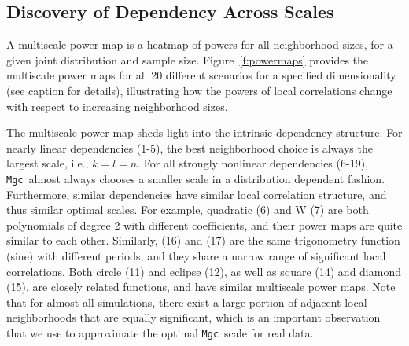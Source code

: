 \documentclass[11pt]{article}
\providecommand{\sct}[1]{{\sc \texttt{#1}}}
\newcommand{\Mgc}{\sct{Mgc}}
\newcommand{\Mgcp}{\sct{Mgc$_P$}}
\newcommand{\Hhg}{\sct{Hhg}}
\newcommand{\Dcorr}{\sct{Dcorr}}
\newcommand{\Mcorr}{\sct{Mcorr}}
\newcommand{\Mantel}{\sct{Mantel}}
\begin{document}

\subsection*{Discovery of Dependency Across Scales}
\label{main3}

A multiscale power map is a heatmap of powers for all neighborhood sizes, for a given joint distribution and sample size.
Figure~\ref{f:powermaps} provides the multiscale power maps for all 20 different scenarios for a specified dimensionality (see caption for details), illustrating how the powers of local correlations change with respect to increasing neighborhood sizes.

The multiscale power map sheds light into the intrinsic dependency structure.
For nearly linear dependencies (1-5), the best neighborhood choice is always the largest scale, i.e., $k=l=n$. For all strongly nonlinear dependencies (6-19), \Mgc~almost always chooses a smaller scale in a distribution dependent fashion. Furthermore, similar dependencies have similar local correlation structure, and thus similar optimal scales. For example, quadratic (6) and W (7) are both polynomials of degree 2 with different coefficients, and their power maps are quite similar to each other. Similarly,  (16) and (17) are the same trigonometry function (sine) with different periods, and they share a narrow range of significant local correlations.
Both circle (11) and eclipse (12), as well as square (14) and diamond (15), are closely related functions, and have similar multiscale power maps.
Note that for almost all simulations, there exist a large portion of adjacent local neighborhoods that are equally significant, which is an important observation that we use to approximate the optimal \Mgc~scale for real data.
\end{document}
